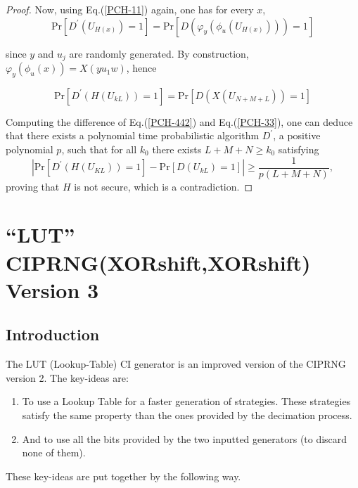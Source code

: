 \begin{proof}
Now, using Eq.(\ref{PCH-11}) again, one has  for every $x$,
\begin{equation}\label{PCH-33}
\mathrm{Pr}[D^\prime(U_{H(x)})=1]=\mathrm{Pr}[D(\varphi_y(\phi_u(U_{H(x)})))=1] 
\end{equation}

\noindent since $y$ and $u_j$ are randomly generated. 
By construction, $\varphi_y(\phi_u(x))=X(yu_1w)$, hence 

\begin{equation}\label{PCH-442}
\mathrm{Pr}[D^\prime(H(U_{kL}))=1]=\mathrm{Pr}[D(X(U_{N+M+L}))=1]
\end{equation}

Computing the difference of Eq.(\ref{PCH-442}) and Eq.(\ref{PCH-33}), one can deduce that
there exists a polynomial time probabilistic
algorithm $D^\prime$, a positive polynomial $p$, such that for all $k_0$ there exists
$L+M+N\geq {k_0}$ satisfying 
$$| \mathrm{Pr}[D^\prime(H(U_{KL}))=1]-\mathrm{Pr}[D(U_{kL})=1]|\geq \frac{1}{p(L+M+N)},$$
proving that $H$ is not secure, which is a contradiction. 
\end{proof}



\section{``LUT'' CIPRNG(XORshift,XORshift) Version 3}
\label{LUT CI(XORshift,XORshift) algorithms and example}
\subsection{Introduction}

The LUT (Lookup-Table) CI generator is an improved version of the CIPRNG version 2. The key-ideas are:
\begin{enumerate}
\item To use a Lookup Table for a faster generation of strategies. 
These strategies satisfy the same property than the ones provided by the decimation process.
\item And to use all the bits provided by the two inputted generators (to discard none of them).
\end{enumerate}
These key-ideas are put together by the following way.

